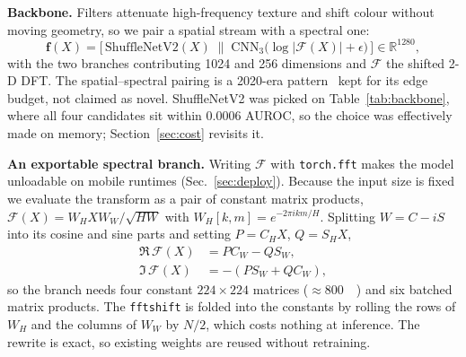 \documentclass[conference]{IEEEtran}
\begin{document}
\textbf{Backbone.} Filters attenuate high-frequency texture and shift colour without moving
geometry, so we pair a spatial stream with a spectral one:
\begin{equation}
\mathbf{f}(X) = \big[\,\mathrm{ShuffleNetV2}(X)\;\|\;\mathrm{CNN}_3\!\big(\log|\mathcal{F}(X)|+\epsilon\big)\,\big]
\in \mathbb{R}^{1280},
\end{equation}
with the two branches contributing 1024 and 256 dimensions and $\mathcal{F}$ the shifted
2-D DFT. The spatial--spectral pairing is a 2020-era pattern~\cite{qian2020,liu2021} kept for
its edge budget, not claimed as novel. ShuffleNetV2 was picked on Table~\ref{tab:backbone},
where all four candidates sit within 0.0006 AUROC, so the choice was effectively made on
memory; Section~\ref{sec:cost} revisits it.

\textbf{An exportable spectral branch.} Writing $\mathcal{F}$ with \texttt{torch.fft} makes
the model unloadable on mobile runtimes (Sec.~\ref{sec:deploy}). Because the input size is
fixed we evaluate the transform as a pair of constant matrix products,
$\mathcal{F}(X) = W_H X W_W / \sqrt{HW}$ with $W_H[k,m]=e^{-2\pi i km/H}$. Splitting
$W = C - iS$ into its cosine and sine parts and setting $P = C_H X$, $Q = S_H X$,
\begin{align}
\Re\,\mathcal{F}(X) &= P C_W - Q S_W, \label{eq:dftre}\\
\Im\,\mathcal{F}(X) &= -(P S_W + Q C_W), \label{eq:dftim}
\end{align}
so the branch needs four constant $224\!\times\!224$ matrices ($\approx$\SI{800}{\kilo\byte})
and six batched matrix products. The \texttt{fftshift} is folded into the constants by
rolling the rows of $W_H$ and the columns of $W_W$ by $N/2$, which costs nothing at
inference. The rewrite is exact, so existing weights are reused without retraining.
\end{document}

